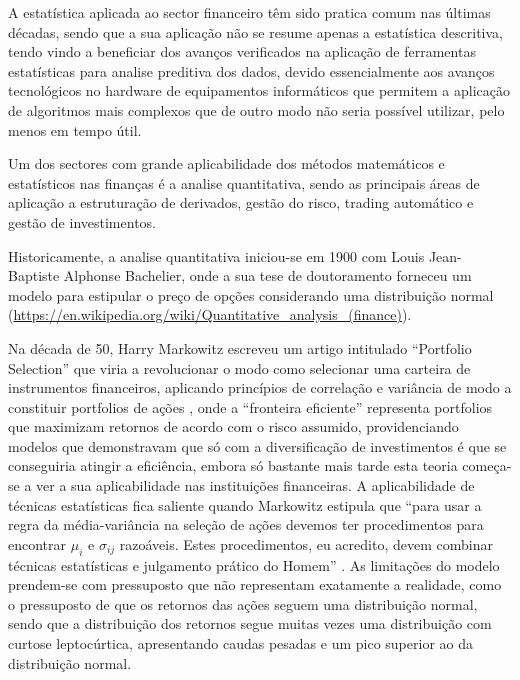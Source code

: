 \documentclass[
  12pt,
  a4paper,
  openany]{book}
\begin{document}
A estatística aplicada ao sector financeiro têm sido pratica comum nas últimas décadas, sendo que a sua aplicação não se resume apenas a estatística descritiva, tendo vindo a beneficiar dos avanços verificados na aplicação de ferramentas estatísticas para analise preditiva dos dados, devido essencialmente aos avanços tecnológicos no hardware de equipamentos informáticos que permitem a aplicação de algoritmos mais complexos que de outro modo não seria possível utilizar, pelo menos em tempo útil.

Um dos sectores com grande aplicabilidade dos métodos matemáticos e estatísticos nas finanças é a analise quantitativa, sendo as principais áreas de aplicação a estruturação de derivados, gestão do risco, trading automático e gestão de investimentos.

Historicamente, a analise quantitativa iniciou-se em 1900 com Louis Jean-Baptiste Alphonse Bachelier, onde a sua tese de doutoramento forneceu um modelo para estipular o preço de opções considerando uma distribuição normal (\url{https://en.wikipedia.org/wiki/Quantitative_analysis_(finance)}).

Na década de 50, Harry Markowitz escreveu um artigo intitulado ``Portfolio Selection'' que viria a revolucionar o modo como selecionar uma carteira de instrumentos financeiros, aplicando princípios de correlação e variância de modo a constituir portfolios de ações , onde a ``fronteira eficiente'' representa portfolios que maximizam retornos de acordo com o risco assumido, providenciando modelos que demonstravam que só com a diversificação de investimentos é que se conseguiria atingir a eficiência, embora só bastante mais tarde esta teoria começa-se a ver a sua aplicabilidade nas instituições financeiras. A aplicabilidade de técnicas estatísticas fica saliente quando Markowitz estipula que ``para usar a regra da média-variância na seleção de ações devemos ter procedimentos para encontrar \(\mu_i\) e \(\sigma_{ij}\) razoáveis. Estes procedimentos, eu acredito, devem combinar técnicas estatísticas e julgamento prático do Homem'' \citep[pp.91]{Markowitz1952}. As limitações do modelo prendem-se com pressuposto que não representam exatamente a realidade, como o pressuposto de que os retornos das ações seguem uma distribuição normal, sendo que a distribuição dos retornos segue muitas vezes uma distribuição com curtose leptocúrtica, apresentando caudas pesadas e um pico superior ao da distribuição normal.
\end{document}
